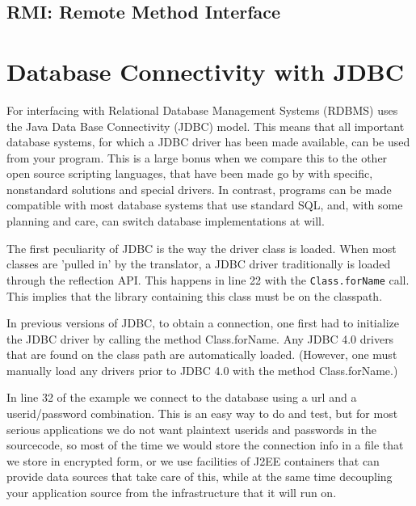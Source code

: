 \section{RMI: Remote Method Interface}

\chapter{Database Connectivity with JDBC}
For interfacing with Relational Database Management Systems (RDBMS)
\nr{} uses the Java Data Base Connectivity (JDBC) model. This means
that all important database systems, for which a JDBC driver has
been made available, can be used from your \nr{} program. This is a
large bonus when we compare this to the other open source scripting
languages, that have been made go by with specific, nonstandard
solutions and special drivers. In contrast, \nr{} programs can be
made compatible with most database systems that use standard SQL, and,
with some planning and care, can switch database implementations at
will.
 

The first peculiarity of JDBC is the way the driver class is
loaded. When most classes are 'pulled in' by the translator, a JDBC
driver traditionally is loaded through the reflection API. This
happens in line 22 with the \texttt{Class.forName} call. This implies
that the library containing this class must be on the classpath.

\begin{shaded}\noindent
In previous versions of JDBC, to obtain a connection, one first had to
initialize the JDBC driver by calling the method Class.forName. Any
JDBC 4.0 drivers that are found on the class path are automatically
loaded. (However, one must manually load any drivers prior to JDBC 4.0
with the method Class.forName.)
\end{shaded}\indent

In line 32 of the example we connect to the database using a url and a
userid/password combination. This is an easy way to do and test, but
for most serious applications we do not want plaintext userids and
passwords in the sourcecode, so most of the time we would store the
connection info in a file that we store in encrypted form, or we use
facilities of J2EE containers that can provide data sources that take
care of this, while at the same time decoupling your application
source from the infrastructure that it will run on.

